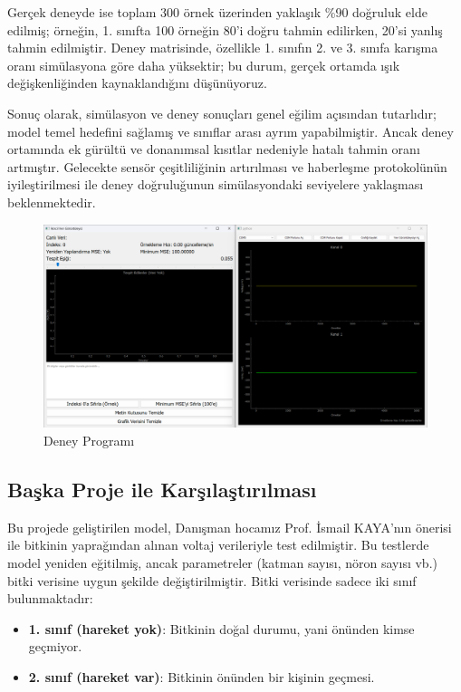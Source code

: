 Gerçek deneyde ise toplam 300 örnek üzerinden yaklaşık \%90 doğruluk elde edilmiş; örneğin, 1. sınıfta 100 örneğin 80’i doğru tahmin edilirken, 20’si yanlış tahmin edilmiştir. Deney matrisinde, özellikle 1. sınıfın 2. ve 3. sınıfa karışma oranı simülasyona göre daha yüksektir; bu durum, gerçek ortamda ışık değişkenliğinden kaynaklandığını düşünüyoruz.


Sonuç olarak, simülasyon ve deney sonuçları genel eğilim açısından tutarlıdır; model temel hedefini sağlamış ve sınıflar arası ayrım yapabilmiştir. Ancak deney ortamında ek gürültü ve donanımsal kısıtlar nedeniyle hatalı tahmin oranı artmıştır. Gelecekte sensör çeşitliliğinin artırılması ve haberleşme protokolünün iyileştirilmesi ile deney doğruluğunun simülasyondaki seviyelere yaklaşması beklenmektedir.


\begin{figure}[H]
    \centering
    \includegraphics[width=1\linewidth]{media/image_deney.png}
    \caption{Deney Programı}
    \label{fig:deney}
\end{figure}


\subsection{Başka Proje ile Karşılaştırılması}

Bu projede geliştirilen model, Danışman hocamız Prof. İsmail KAYA'nın önerisi ile bitkinin yaprağından alınan voltaj verileriyle test edilmiştir. Bu testlerde model yeniden eğitilmiş, ancak parametreler (katman sayısı, nöron sayısı vb.) bitki verisine uygun şekilde değiştirilmiştir. Bitki verisinde sadece iki sınıf bulunmaktadır:
\begin{itemize}
    \item \textbf{1. sınıf (hareket yok)}: Bitkinin doğal durumu, yani önünden kimse geçmiyor.
    \item \textbf{2. sınıf (hareket var)}: Bitkinin önünden bir kişinin geçmesi.
\end{itemize}

